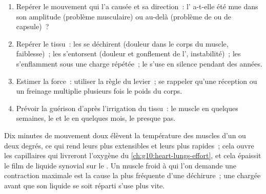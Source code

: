 \begin{method}\label{met:g10:muscles-and-joints:analyse}
\begin{enumerate}
  \item Repérer le mouvement qui l'a causée et sa direction~:
        l' a-t-elle été mue dans son amplitude (problème
        musculaire) ou au-delà (problème de  ou de capsule)~?
  \item Repérer le tissu~: les  se déchirent
        (douleur dans le corps du muscle, faiblesse)~; les 
        s'entorsent (douleur et gonflement de l',
        instabilité)~; les  s'enflamment sous une charge
        répétée~; le  s'use en silence pendant des années.
  \item Estimer la force~: utiliser la règle du levier~; se rappeler
        qu'une réception ou un freinage multiplie plusieurs fois le
        poids du corps.
  \item Prévoir la guérison d'après l'irrigation du tissu~: le muscle
        en quelques semaines, le  et le  en quelques
        mois, le  presque pas.
\end{enumerate}
\end{method}

\begin{remark}\label{rem:g10:muscles-and-joints:warmup}
Dix minutes de mouvement doux élèvent la température des muscles d'un
ou deux degrés, ce qui rend leurs  plus extensibles et leurs
 plus rapides~; cela ouvre les capillaires qui livreront
l'oxygène du \cref{ch:g10:heart-lungs-effort}, et cela épaissit le film
de liquide synovial sur le . Un muscle froid à qui l'on
demande une contraction maximale est la cause la plus fréquente d'une
déchirure~; une  chargée avant que son liquide se soit
réparti s'use plus vite.
\end{remark}

